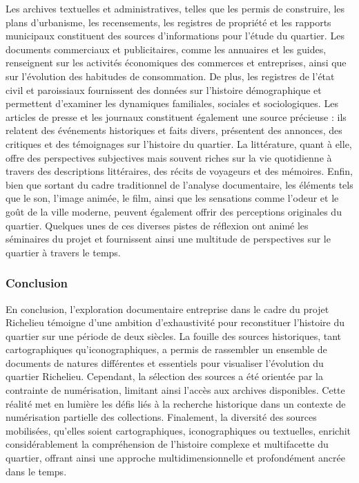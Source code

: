 Les archives textuelles et administratives, telles que les permis de construire, les plans d'urbanisme, les recensements, les registres de propriété et les rapports municipaux constituent des sources d'informations pour l'étude du quartier. Les documents commerciaux et publicitaires, comme les annuaires et les guides, renseignent sur les activités économiques des commerces et entreprises, ainsi que sur l'évolution des habitudes de consommation. De plus, les registres de l'état civil et paroissiaux fournissent des données sur l'histoire démographique et permettent d'examiner les dynamiques familiales, sociales et sociologiques. Les articles de presse et les journaux constituent également une source précieuse : ils relatent des événements historiques et faits divers, présentent des annonces, des critiques et des témoignages sur l'histoire du quartier. La littérature, quant à elle, offre des perspectives subjectives mais souvent riches sur la vie quotidienne à travers des descriptions littéraires, des récits de voyageurs et des mémoires. Enfin, bien que sortant du cadre traditionnel de l'analyse documentaire, les éléments tels que le son, l'image animée, le film, ainsi que les sensations comme l'odeur et le goût de la ville moderne, peuvent également offrir des perceptions originales du quartier. Quelques unes de ces diverses pistes de réflexion ont animé les séminaires du projet et fournissent ainsi une multitude de perspectives sur le quartier à travers le temps.

\subsubsection{Conclusion}
En conclusion, l'exploration documentaire entreprise dans le cadre du projet Richelieu témoigne d'une ambition d'exhaustivité pour reconstituer l'histoire du quartier sur une période de deux siècles. La fouille des sources historiques, tant cartographiques qu'iconographiques, a permis de rassembler un ensemble de documents de natures différentes et essentiels pour visualiser l'évolution du quartier Richelieu. Cependant, la sélection des sources a été orientée par la contrainte de numérisation, limitant ainsi l'accès aux archives disponibles. Cette réalité met en lumière les défis liés à la recherche historique dans un contexte de numérisation partielle des collections. Finalement, la diversité des sources mobilisées, qu'elles soient cartographiques, iconographiques ou textuelles, enrichit considérablement la compréhension de l'histoire complexe et multifacette du quartier, offrant ainsi une approche multidimensionnelle et profondément ancrée dans le temps.


